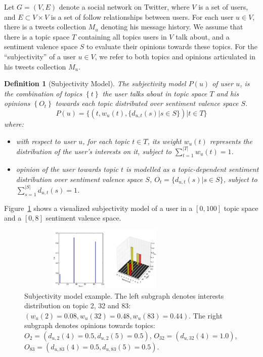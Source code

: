 \documentclass{acm_proc_article-sp}
\newtheorem{definition}{Definition}
\begin{document}
Let $G=\left( V,E \right) $ denote a social network on Twitter, where $ V $ is a set of users, and $ E\subset V\times V $ is a set of follow relationships between users. For each user $ u \in V $, there is a tweets collection $ M_{u} $ denoting his message history. We assume that there is a topic space $ T $ containing all topics users in $ V $ talk about, and a sentiment valence space $ S $ to evaluate their opinions towards these topics. 
For the ``subjectivity'' of a user $ u  \in V $, we refer to both topics and opinions articulated in his tweets collection $ M_{u} $.  
\begin{definition}[Subjectivity Model]
The subjectivity model $ P \left( u \right) $ of user $ u $, is the combination of topics $\left\lbrace  t \right\rbrace $ the user talks about in topic space $T$ and his opinions $\left\lbrace O_{t}\right\rbrace $ towards each topic distributed over sentiment valence space $ S $. 
\begin{equation}
\label{usermodel}
P \left( u \right) = \lbrace \left( t, w_{u} \left( t \right), \lbrace d_{u,t} \left( s \right)|s \in S \rbrace \right) |  t \in T \rbrace
\end{equation}
where:
\begin{itemize}
\item with respect to user $ u $, for each topic $t \in T$, its weight $ w_{u} \left( t \right)$ represents the distribution of the user's interests on it, subject to $ \sum_{t=1}^{|T|}w_{u} \left( t \right)=1 $.
\item opinion of the user towards topic $t$ is modelled as a topic-dependent sentiment distribution over sentiment valence space $ S $, $O_{t}=\lbrace d_{u,t} \left( s \right)|s \in S \rbrace $, subject to $ \sum_{s=1}^{|S|} d_{u,t} \left( s \right)=1$.
\end{itemize}
\end{definition}
Figure~\ref{fig0} shows a visualized subjectivity model of a user in a $ [0,100] $ topic space and a $ [0,8] $ sentiment valence space. 
\begin{figure}[t]
\includegraphics[width=3.3in,height=1.2in]{fig1.pdf}
\caption{Subjectivity model example. The left subgraph denotes interests distribution on topic 2, 32 and 83: $ (  w_{u}\left( 2 \right)=0.08,w_{u}\left( 32 \right)=0.48, w_{u}\left( 83 \right)=0.44)  $. The right subgraph denotes opinions towards topics: $ O_{2}=( d_{u,2} \left( 4 \right)=0.5, d_{u,2} \left( 5 \right)=0.5)$, $O_{32}=(d_{u,32} \left( 4 \right)=1.0) $, $ O_{83}=( d_{u,83} \left( 4 \right)=0.5, d_{u,83} \left( 5 \right)=0.5 ) $.}
\label{fig0}
\end{figure}
\end{document}
